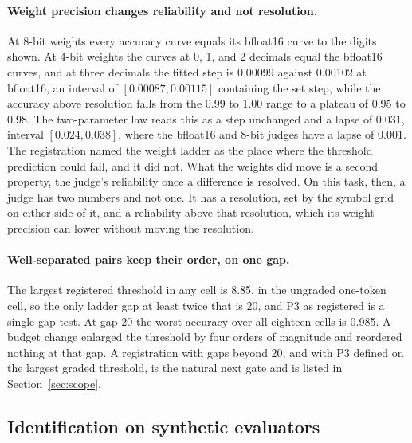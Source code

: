 \documentclass{article}
\theoremstyle{definition}
\theoremstyle{remark}
\newif\ifcornerstone
\begin{document}
\paragraph{Weight precision changes reliability and not resolution.}
At 8-bit weights every accuracy curve equals its bfloat16 curve to the digits shown.
At 4-bit weights the curves at 0, 1, and 2 decimals equal the bfloat16 curves, and at three decimals the fitted step is 0.00099 against 0.00102 at bfloat16, an interval of $[0.00087,0.00115]$ containing the set step, while the accuracy above resolution falls from the 0.99 to 1.00 range to a plateau of 0.95 to 0.98.
The two-parameter law reads this as a step unchanged and a lapse of 0.031, interval $[0.024,0.038]$, where the bfloat16 and 8-bit judges have a lapse of 0.001.
The registration named the weight ladder as the place where the threshold prediction could fail, and it did not.
What the weights did move is a second property, the judge's reliability once a difference is resolved.
On this task, then, a judge has two numbers and not one. It has a resolution, set by the symbol grid on either side of it, and a reliability above that resolution, which its weight precision can lower without moving the resolution.

\paragraph{Well-separated pairs keep their order, on one gap.}
The largest registered threshold in any cell is 8.85, in the ungraded one-token cell, so the only ladder gap at least twice that is 20, and P3 as registered is a single-gap test.
At gap 20 the worst accuracy over all eighteen cells is 0.985.
A budget change enlarged the threshold by four orders of magnitude and reordered nothing at that gap.
A registration with gaps beyond 20, and with P3 defined on the largest graded threshold, is the natural next gate and is listed in Section~\ref{sec:scope}.

\ifcornerstone
\subsection{Identification on synthetic evaluators}
\label{sec:gates}
\end{document}
